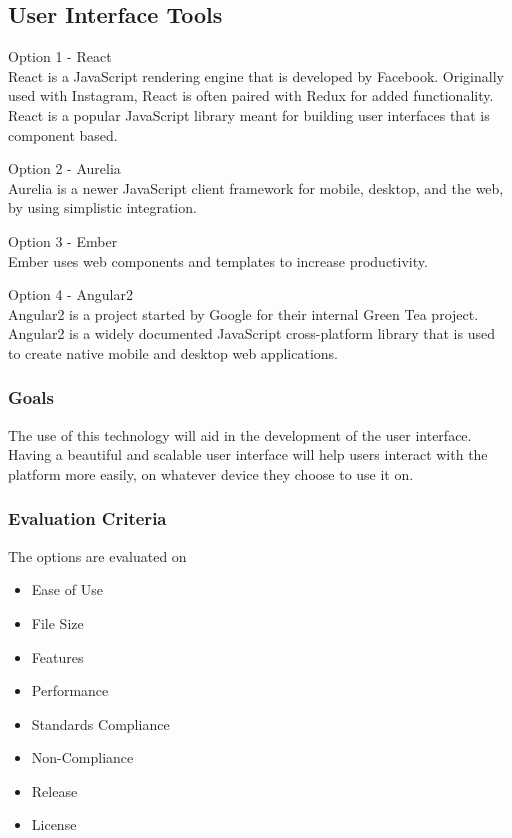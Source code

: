 \documentclass[onecolumn, draftclsnofoot,10pt, compsoc]{IEEEtran}
\begin{document}
{\subsection{User Interface Tools}
\noindent Option 1 - React \cite{React} \\
\noindent React is a JavaScript rendering engine that is developed by Facebook. Originally used with Instagram, React is often paired with Redux for added functionality. React is a popular JavaScript library meant for building user interfaces that is component based.

\medskip

\noindent Option 2 - Aurelia \cite{Aurelia} \\
\noindent Aurelia is a newer JavaScript client framework for mobile, desktop, and the web, by using simplistic integration.

\medskip

\noindent Option 3 - Ember \cite{Ember} \\
\noindent Ember uses web components and templates to increase productivity.

\medskip

\noindent Option 4 - Angular2 \cite{Angular2} \\
\noindent Angular2 is a project started by Google for their internal Green Tea project. Angular2 is a widely documented JavaScript cross-platform library that is used to create native mobile and desktop web applications.

\medskip
\subsubsection{Goals}
{\noindent The use of this technology will aid in the development of the user interface. Having a beautiful and scalable user interface will help users interact with the platform more easily, on whatever device they choose to use it on. \par}

\medskip

\subsubsection{Evaluation Criteria}
\noindent The options are evaluated on

\begin{itemize}
\item Ease of Use
\item File Size
\item Features
\item Performance
\item Standards Compliance
\item Non-Compliance
\item Release
\item License
\end{itemize}



}
\end{document}
